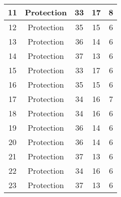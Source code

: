 \documentclass[results.tex]{subfiles}
\begin{document}
\begin{center}
\begin{tabular}{| c || c | c | c | c |}
            \hline
            11                      & Protection                   & 33                     & 17                      & 8                    \\
            \hline
            12                      & Protection                   & 35                     & 15                      & 6                    \\
            \hline
            13                      & Protection                   & 36                     & 14                      & 6                    \\
            \hline
            14                      & Protection                   & 37                     & 13                      & 6                    \\
            \hline
            15                      & Protection                   & 33                     & 17                      & 6                    \\
            \hline
            16                      & Protection                   & 35                     & 15                      & 6                    \\
            \hline
            17                      & Protection                   & 34                     & 16                      & 7                    \\
            \hline
            18                      & Protection                   & 34                     & 16                      & 6                    \\
            \hline
            19                      & Protection                   & 36                     & 14                      & 6                    \\
            \hline
            20                      & Protection                   & 36                     & 14                      & 6                    \\
            \hline
            21                      & Protection                   & 37                     & 13                      & 6                    \\
            \hline
            22                      & Protection                   & 34                     & 16                      & 6                    \\
            \hline
            23                      & Protection                   & 37                     & 13                      & 6                    \\

\end{tabular}
\end{center}
\end{document}
